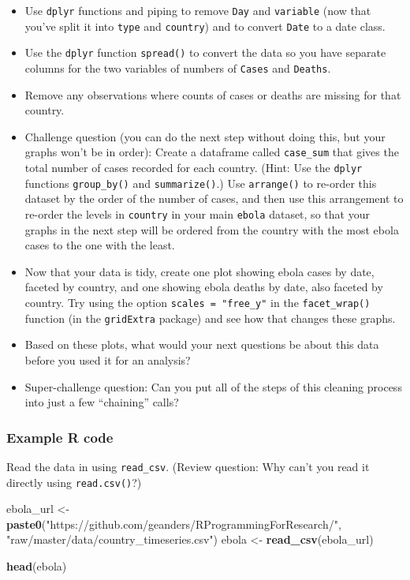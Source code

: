 \documentclass[]{book}
\makeatletter
\newenvironment{Shaded}{\begin{snugshade}}{\end{snugshade}}
\newcommand{\KeywordTok}[1]{\textcolor[rgb]{0.13,0.29,0.53}{\textbf{#1}}}
\newcommand{\StringTok}[1]{\textcolor[rgb]{0.31,0.60,0.02}{#1}}
\newcommand{\NormalTok}[1]{#1}
\providecommand{\tightlist}{%
  \setlength{\itemsep}{0pt}\setlength{\parskip}{0pt}}
\newenvironment{kframe}{%
\medskip{}
\setlength{\fboxsep}{.8em}
 \def\at@end@of@kframe{}%
 \ifinner\ifhmode%
  \def\at@end@of@kframe{\end{minipage}}%
  \begin{minipage}{\columnwidth}%
 \fi\fi%
 \def\FrameCommand##1{\hskip\@totalleftmargin \hskip-\fboxsep
 \colorbox{shadecolor}{##1}\hskip-\fboxsep
     \hskip-\linewidth \hskip-\@totalleftmargin \hskip\columnwidth}%
 \MakeFramed {\advance\hsize-\width
   \@totalleftmargin\z@ \linewidth\hsize
   \@setminipage}}%
 {\par\unskip\endMakeFramed%
 \at@end@of@kframe}
\renewenvironment{Shaded}{\begin{kframe}}{\end{kframe}}
\theoremstyle{definition}
\theoremstyle{definition}
\theoremstyle{definition}
\theoremstyle{remark}
\makeatother
\begin{document}
\begin{itemize}
\tightlist
\item
  Use \texttt{dplyr} functions and piping to remove \texttt{Day} and
  \texttt{variable} (now that you've split it into \texttt{type} and
  \texttt{country}) and to convert \texttt{Date} to a date class.
\item
  Use the \texttt{dplyr} function \texttt{spread()} to convert the data
  so you have separate columns for the two variables of numbers of
  \texttt{Cases} and \texttt{Deaths}.
\item
  Remove any observations where counts of cases or deaths are missing
  for that country.
\item
  Challenge question (you can do the next step without doing this, but
  your graphs won't be in order): Create a dataframe called
  \texttt{case\_sum} that gives the total number of cases recorded for
  each country. (Hint: Use the \texttt{dplyr} functions
  \texttt{group\_by()} and \texttt{summarize()}.) Use \texttt{arrange()}
  to re-order this dataset by the order of the number of cases, and then
  use this arrangement to re-order the levels in \texttt{country} in
  your main \texttt{ebola} dataset, so that your graphs in the next step
  will be ordered from the country with the most ebola cases to the one
  with the least.
\item
  Now that your data is tidy, create one plot showing ebola cases by
  date, faceted by country, and one showing ebola deaths by date, also
  faceted by country. Try using the option \texttt{scales\ =\ "free\_y"}
  in the \texttt{facet\_wrap()} function (in the \texttt{gridExtra}
  package) and see how that changes these graphs.
\item
  Based on these plots, what would your next questions be about this
  data before you used it for an analysis?
\item
  Super-challenge question: Can you put all of the steps of this
  cleaning process into just a few ``chaining'' calls?
\end{itemize}

\subsubsection{Example R code}\label{example-r-code-11}

Read the data in using \texttt{read\_csv}. (Review question: Why can't
you read it directly using \texttt{read.csv()}?)

\begin{Shaded}
\begin{Highlighting}[]
\NormalTok{ebola_url <-}\StringTok{ }\KeywordTok{paste0}\NormalTok{(}\StringTok{"https://github.com/geanders/RProgrammingForResearch/"}\NormalTok{,}
              \StringTok{"raw/master/data/country_timeseries.csv"}\NormalTok{)}
\NormalTok{ebola <-}\StringTok{ }\KeywordTok{read_csv}\NormalTok{(ebola_url)}

\KeywordTok{head}\NormalTok{(ebola)}
\end{Highlighting}
\end{Shaded}
\end{document}
